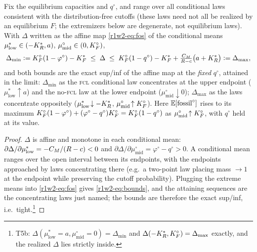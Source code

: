 \begin{theorem}\label{r1w2-thm:tight}
Fix the equilibrium capacities and $q^{\circ}$, and range over all conditional laws
consistent with the distribution-free cutoffs (these laws need not all be realized
by an equilibrium $F$; the extremizers below are degenerate, not equilibrium
laws). With $\Delta$ written as the affine
map \eqref{r1w2-eq:fos} of the conditional means
$\mu^{*}_{\mathrm{low}}\in(-K_R^{*},a)$, $\mu^{\circ}_{\mathrm{mid}}\in(0,K_F^{\circ})$,
\begin{equation}\label{r1w2-eq:bounds}
  \Delta_{\min}\vcentcolon=K_F^{\circ}(1-\varphi^{\circ})-K_F^{*}\;\le\;\Delta\;\le\;
  K_F^{\circ}(1-q^{\circ})-K_F^{*}+\tfrac{C_M}{R-c}\big(a+K_R^{*}\big)\vcentcolon=\Delta_{\max},
\end{equation}
and both bounds are the exact sup/inf of the affine map at the \emph{fixed}
$q^{\circ}$, attained in the limit: $\Delta_{\min}$ as the
\textsc{fcl} conditional law concentrates at the upper endpoint
($\mu^{*}_{\mathrm{low}}\!\uparrow a$) and the no-\textsc{fcl} law at the lower
endpoint ($\mu^{\circ}_{\mathrm{mid}}\!\downarrow0$); $\Delta_{\max}$ as the laws
concentrate oppositely ($\mu^{*}_{\mathrm{low}}\!\downarrow-K_R^{*}$,
$\mu^{\circ}_{\mathrm{mid}}\!\uparrow K_F^{\circ}$). Here
$\mathbb{E}[\text{fossil}^{\circ}]$ rises to its maximum
$K_F^{\circ}(1-\varphi^{\circ})+(\varphi^{\circ}-q^{\circ})K_F^{\circ}=K_F^{\circ}(1-q^{\circ})$ as
$\mu^{\circ}_{\mathrm{mid}}\!\uparrow K_F^{\circ}$, with $q^{\circ}$ held at its value.
\end{theorem}

\begin{proof}
$\Delta$ is affine and monotone in each conditional mean:
$\partial\Delta/\partial\mu^{*}_{\mathrm{low}}=-C_M/(R-c)<0$ and
$\partial\Delta/\partial\mu^{\circ}_{\mathrm{mid}}=\varphi^{\circ}-q^{\circ}>0$.
A conditional mean ranges over the open interval between its endpoints, with the
endpoints approached by laws concentrating there (e.g.\ a two-point law placing
mass $\to1$ at the endpoint while preserving the cutoff probability). Plugging the
extreme means into \eqref{r1w2-eq:fos} gives \eqref{r1w2-eq:bounds}, and the attaining
sequences are the concentrating laws just named; the bounds are therefore the
exact sup/inf, i.e.\ tight.\footnote{T5b: $\Delta(\mu^{*}_{\mathrm{low}}{=}a,\mu^{\circ}_{\mathrm{mid}}{=}0)=\Delta_{\min}$
and $\Delta(-K_R^{*},K_F^{\circ})=\Delta_{\max}$ exactly, and the realized $\Delta$ lies
strictly inside.}
\end{proof}

